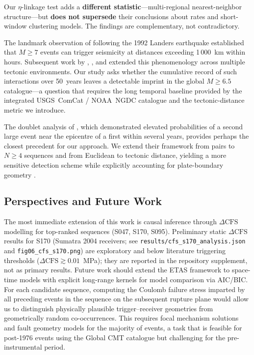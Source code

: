 \documentclass[draft]{agujournal2019}
\begin{document}
Our $\eta$-linkage test adds a \textbf{different statistic}---multi-regional
nearest-neighbor structure---but \textbf{does not supersede} their
conclusions about rates and short-window clustering models.
The findings are complementary, not contradictory.

The landmark observation of \citet{Hill1993} following the 1992 Landers
earthquake established that $M \geq 7$ events can trigger seismicity at
distances exceeding 1\,000~km within hours.  Subsequent work by
\citet{Brodsky2006}, \citet{Gomberg2001}, and \citet{Parsons2002}
extended this phenomenology across multiple tectonic environments.  Our
study asks whether the cumulative record of such interactions over
50~years leaves a detectable imprint in the global $M \geq 6.5$
catalogue---a question that requires the long temporal baseline provided
by the integrated USGS~ComCat / NOAA~NGDC catalogue and the
tectonic-distance metric we introduce.

The doublet analysis of \citet{KaganJackson1999}, which demonstrated
elevated probabilities of a second large event near the epicentre of a
first within several years, provides perhaps the closest precedent for
our approach.  We extend their framework from pairs to $N \geq 4$
sequences and from Euclidean to tectonic distance, yielding a more
sensitive detection scheme while explicitly accounting for plate-boundary
geometry \citep{Bird2003}.

\subsection{Perspectives and Future Work}
\label{subsec:perspectives}

The most immediate extension of this work is causal inference through
$\Delta\mathrm{CFS}$ modelling for top-ranked sequences (S047, S170, S095).
Preliminary static $\Delta\mathrm{CFS}$ results for S170 (Sumatra 2004
receivers; see \texttt{results/cfs\_s170\_analysis.json} and
\texttt{fig06\_cfs\_s170.png}) are exploratory and below literature
triggering thresholds ($\Delta\mathrm{CFS} \gtrsim 0.01$~MPa); they are
reported in the repository supplement, not as primary results.
Future work should extend the ETAS framework to space-time models with
explicit long-range kernels
\citep{Ogata1998, HelmstettterSornette2003} for model comparison via AIC/BIC.
For each candidate sequence, computing the Coulomb failure
stress imparted by all preceding events in the sequence on the subsequent
rupture plane \citep{King1994, Toda2005} would allow us to distinguish
physically plausible trigger--receiver geometries from geometrically
random co-occurrences.  This requires focal mechanism solutions and fault
geometry models for the majority of events, a task that is feasible for
post-1976 events using the Global CMT catalogue but challenging for the
pre-instrumental period.
\end{document}
